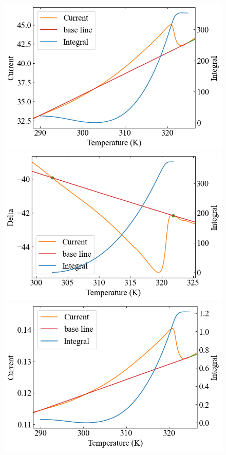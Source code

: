 \documentclass[9pt,dvipdfmx,a4paper]{jsarticle}
\begin{document}
\begin{figure}[hbt]
    \begin{minipage}[t]{0.245\columnwidth}
        \centering
        \includegraphics[width = \columnwidth]{appendix/TGS-dHdt-heat.png}
    \end{minipage}
    \hfill
    \begin{minipage}[t]{0.245\columnwidth}
        \centering
        \includegraphics[width = \columnwidth]{appendix/TGS-dHdt-cool.png}
    \end{minipage}
    \hfill
    \begin{minipage}[t]{0.245\columnwidth}
        \centering
        \includegraphics[width = \columnwidth]{appendix/TGS-dSdt-heat.png}

\end{minipage}
\end{figure}
\end{document}
